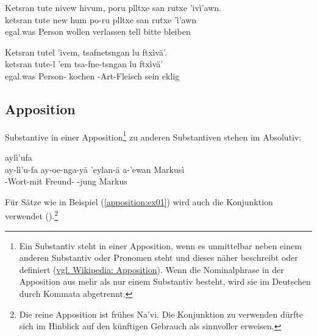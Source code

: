 \begin{interlin} \label{ketsran:ex03}
	\glll \Npawl{}Ketsran tute nivew hivum, poru plltxe san rutxe 'ivì'awn. \\
	ketsran tute new hum po-ru plltxe san rutxe 'ì'awn\\
	egal.was Person wollen verlassen  tell  bitte bleiben \\
\end{interlin}

\begin{interlin} \label{ketsran:ex04}
	\glll \Npawl{}Ketsran tutel 'ivem, tsafnetsngan lu ftxìvä'. \\
	ketsran tute-l 'em tsa-fne-tsngan lu ftxìvä' \\
	egal.was Person- kochen -Art-Fleisch sein eklig \\
\end{interlin}
\noindent{}

\subsection{Apposition} Substantive in einer Apposition\footnote{Ein Substantiv steht in einer Apposition, wenn es unmittelbar neben einem anderen Substantiv oder Pronomen steht und dieses näher beschreibt oder definiert (\href{https://de.wikipedia.org/wiki/Apposition}{vgl. Wikipedia: Apposition}). Wenn die Nominalphrase in der Apposition aus mehr als nur einem Substantiv besteht, wird sie im Deutschen durch Kommata abgetrennt.} zu anderen Substantiven stehen im Absolutiv: 

\begin{interlin} \label{apposition:ex01}
	\glll \Npawl{}aylì'ufa     \\
	ay-lì'u-fa ay-oe-nga-yä 'eylan-ä a-'ewan Markusì \\
	-Wort-mit  Freund- -jung Markus \\
\end{interlin}

\noindent Für Sätze wie in Beispiel (\ref{apposition:ex01}) wird auch die Konjunktion  verwendet ().\footnote{Die reine Apposition ist frühes Na’vi. Die Konjunktion  zu verwenden dürfte sich im Hinblick auf den künftigen Gebrauch als sinnvoller erweisen.} 

